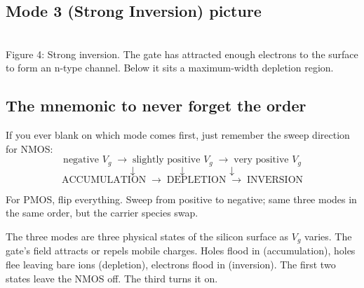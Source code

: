 \documentclass[11pt]{article}
\begin{document}
\subsection{Mode 3 (Strong Inversion) picture}

\begin{center}
\\
{\small Figure 4: Strong inversion. The gate has attracted enough electrons to the surface to form an n-type channel. Below it sits a maximum-width depletion region.}
\end{center}

\subsection{The mnemonic to never forget the order}

If you ever blank on which mode comes first, just remember the sweep direction for NMOS:
\[
\boxed{\text{negative } V_g \;\to\; \text{slightly positive } V_g \;\to\; \text{very positive } V_g}
\]
\[
\downarrow \qquad\qquad \downarrow \qquad\qquad \downarrow
\]
\[
\text{ACCUMULATION} \;\to\; \text{DEPLETION} \;\to\; \text{INVERSION}
\]

For PMOS, flip everything. Sweep from positive to negative; same three modes in the same order, but the carrier species swap.

\begin{checkpoint}
The three modes are three physical states of the silicon surface as $V_g$ varies. The gate's field attracts or repels mobile charges. Holes flood in (accumulation), holes flee leaving bare ions (depletion), electrons flood in (inversion). The first two states leave the NMOS off. The third turns it on.
\end{checkpoint}
\end{document}
